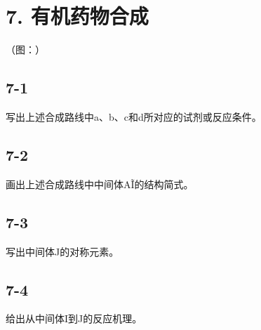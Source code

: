 \section*{7. 有机药物合成}
（图：）

\subsection*{7-1}
写出上述合成路线中a、b、c和d所对应的试剂或反应条件。

\subsection*{7-2}
画出上述合成路线中中间体A\~I的结构简式。

\subsection*{7-3}
写出中间体J的对称元素。

\subsection*{7-4}
给出从中间体I到J的反应机理。
